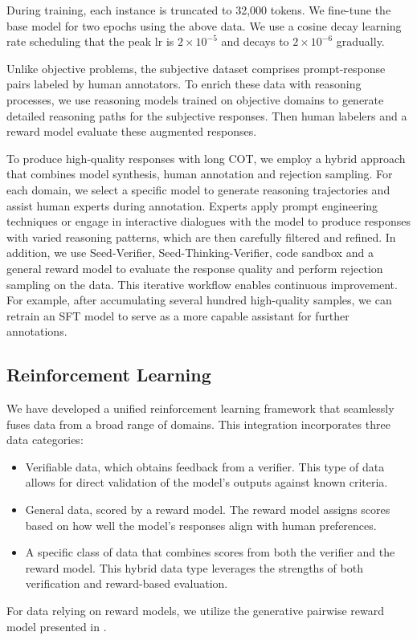 During training, each instance is truncated to 32,000 tokens. We fine-tune the base model for two epochs using the above data. We use a cosine decay learning rate scheduling that the peak lr is $2 \times 10^{-5}$ and decays to $2 \times 10^{-6}$ gradually. 
 
 Unlike objective problems, the subjective dataset comprises prompt-response pairs labeled by human annotators. To enrich these data with reasoning processes, we use reasoning models trained on objective domains to generate detailed reasoning paths for the subjective responses. Then human labelers and a reward model evaluate these augmented responses. 

 To produce high-quality responses with long COT, we employ a hybrid approach that combines model synthesis, human annotation and rejection sampling. For each domain, we select a specific model to generate reasoning trajectories and assist human experts during annotation. Experts apply prompt engineering techniques or engage in interactive dialogues with the model to produce responses with varied reasoning patterns, which are then carefully filtered and refined. In addition, we use Seed-Verifier, Seed-Thinking-Verifier, code sandbox and a general reward model to evaluate the response quality and perform rejection sampling on the data. This iterative workflow enables continuous improvement. For example, after accumulating several hundred high-quality samples, we can retrain an SFT model to serve as a more capable assistant for further annotations.



\subsection{Reinforcement Learning}

We have developed a unified reinforcement learning framework that seamlessly fuses data from a broad range of domains. This integration incorporates three data categories:
\begin{itemize}
    \item Verifiable data, which obtains feedback from a verifier. This type of data allows for direct validation of the model's outputs against known criteria.
    \item General data, scored by a reward model. The reward model assigns scores based on how well the model's responses align with human preferences.
    \item A specific class of data that combines scores from both the verifier and the reward model. This hybrid data type leverages the strengths of both verification and reward-based evaluation.
\end{itemize}
 For data relying on reward models, we utilize the generative pairwise reward model presented in \citep{qrl}.

